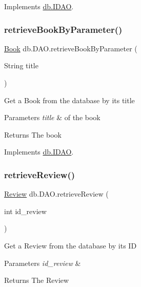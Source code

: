 Implements \hyperlink{interfacedb_1_1_i_d_a_o_a1457ecf91799eaacd17cd3259826fc36}{db.\+I\+D\+AO}.

\mbox{\label{classdb_1_1_d_a_o_a1f8580da682f8a8af4896c491c3b6611}} 
\subsubsection{\texorpdfstring{retrieve\+Book\+By\+Parameter()}{retrieveBookByParameter()}}
{\footnotesize\ttfamily \hyperlink{classserver_1_1data_1_1_book}{Book} db.\+D\+A\+O.\+retrieve\+Book\+By\+Parameter (\begin{DoxyParamCaption}\item[{String}]{title }\end{DoxyParamCaption})}

Get a Book from the database by its title 
\begin{DoxyParams}{Parameters}
{\em title} & of the book \\
\hline
\end{DoxyParams}
\begin{DoxyReturn}{Returns}
The book 
\end{DoxyReturn}


Implements \hyperlink{interfacedb_1_1_i_d_a_o_a4c5eda35bfbba1b0a994efe00f99a544}{db.\+I\+D\+AO}.

\mbox{\label{classdb_1_1_d_a_o_ae43e182fae8ee7028db6ff17c2d5768f}} 
\subsubsection{\texorpdfstring{retrieve\+Review()}{retrieveReview()}}
{\footnotesize\ttfamily \hyperlink{classserver_1_1data_1_1_review}{Review} db.\+D\+A\+O.\+retrieve\+Review (\begin{DoxyParamCaption}\item[{int}]{id\+\_\+review }\end{DoxyParamCaption})}

Get a Review from the database by its ID 
\begin{DoxyParams}{Parameters}
{\em id\+\_\+review} & \\
\hline
\end{DoxyParams}
\begin{DoxyReturn}{Returns}
The Review 
\end{DoxyReturn}


